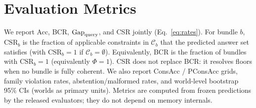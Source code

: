 \section{Evaluation Metrics}
\label{sec:metrics}

We report Acc, BCR, $\mathrm{Gap}_{\mathrm{query}}$, and CSR jointly (Eq.~\ref{eq:rates}). For bundle $b$, $\mathrm{CSR}_b$ is the fraction of applicable constraints in $\mathcal{C}_b$ that the predicted answer set satisfies (with $\mathrm{CSR}_b{=}1$ if $\mathcal{C}_b{=}\emptyset$). Equivalently, BCR is the fraction of bundles with $\mathrm{CSR}_b{=}1$ (equivalently $\Phi{=}1$). CSR does not replace BCR: it resolves floors when no bundle is fully coherent. We also report ConsAcc / PConsAcc grids, family violation rates, abstention/malformed rates, and world-level bootstrap 95\% CIs (worlds as primary units). Metrics are computed from frozen predictions by the released evaluators; they do not depend on memory internals.
